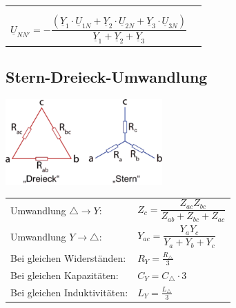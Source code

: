 \begin{tabular}{p{5cm}p{13cm}}
\begin{minipage}{13cm}
                	$\underline{I}_3 = \underline{Y}_3 \cdot \underline{U}_{3N'} = \underline{Y}_3
                	\cdot (\underline{U}_{3N} + \underline{U}_{NN'})$ \\ \\ 
                	$$\underline{U}_{NN'} = \boldsymbol{-} \frac{(\underline{Y}_1 \cdot
                	\underline{U}_{1N} + \underline{Y}_2 \cdot \underline{U}_{2N} + \underline{Y}_3 \cdot
                	\underline{U}_{3N})}{\underline{Y}_1 + \underline{Y}_2 +
                	\underline{Y}_3}$$
                \end{minipage}
			\end{tabular}

	
	\subsection{Stern-Dreieck-Umwandlung}%
	  \begin{minipage}[lt]{7.5 cm}
	    \includegraphics[width=6cm]{bilder/stern-dreieck.png} 
	  \end{minipage}
	  \begin{minipage}[rt]{9.35 cm} %
      \renewcommand{\arraystretch}{2}
	  \begin{tabular}{ll}
	Umwandlung $\triangle \rightarrow Y$: 
		&$Z_{c} = \dfrac{Z_{ac} Z_{bc}}{Z_{ab}+Z_{bc}+Z_{ac}}$\\
	Umwandlung $Y \rightarrow \triangle$: 
		&$Y_{ac}=\dfrac{Y_{a} Y_{c}}{Y_{a}+Y_{b}+Y_{c}}$\\
	Bei gleichen Widerst\"anden:
	&$R_Y = \frac{R_\triangle}{3}$ \\
	Bei gleichen Kapazit\"aten:
	&$C_Y = C_\triangle \cdot 3 $ \\
	Bei gleichen Induktivit\"aten:
	&$L_Y = \frac{L_\triangle}{3}$\\
	  \end{tabular}
      \renewcommand{\arraystretch}{1}
	  \end{minipage}
	
